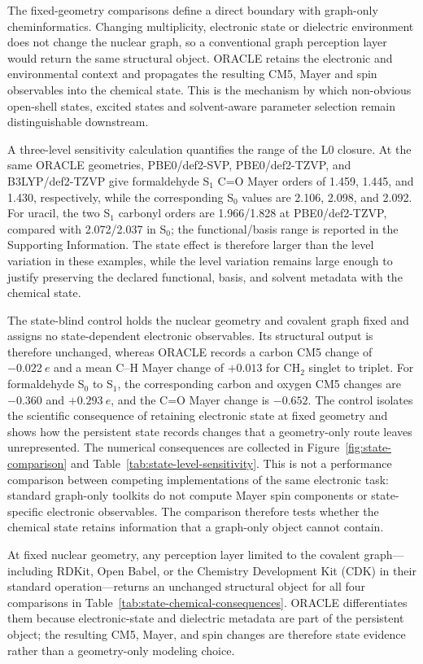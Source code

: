\documentclass[journal=jctcce,manuscript=article]{achemso}
\begin{document}
The fixed-geometry comparisons define a direct boundary with graph-only
cheminformatics. Changing multiplicity, electronic state or dielectric
environment does not change the nuclear graph, so a conventional graph
perception layer would return the same structural object. ORACLE retains the
electronic and environmental context and propagates the resulting CM5, Mayer
and spin observables into the chemical state. This is the mechanism by which
non-obvious open-shell states, excited states and solvent-aware parameter
selection remain distinguishable downstream.

A three-level sensitivity calculation quantifies the range of the L0 closure.
At the same ORACLE geometries, PBE0/def2-SVP, PBE0/def2-TZVP, and
B3LYP/def2-TZVP give formaldehyde S$_1$ C=O Mayer orders of 1.459, 1.445,
and 1.430, respectively, while the corresponding S$_0$ values are 2.106,
2.098, and 2.092. For uracil, the two S$_1$ carbonyl orders are 1.966/1.828
at PBE0/def2-TZVP, compared with 2.072/2.037 in S$_0$; the functional/basis
range is reported in the Supporting Information. The state effect is
therefore larger than the level variation in these examples, while the level
variation remains large enough to justify preserving the declared functional,
basis, and solvent metadata with the chemical state.

The state-blind control holds the nuclear geometry and covalent graph fixed and
assigns no state-dependent electronic observables. Its structural output is
therefore unchanged, whereas ORACLE records a carbon CM5 change of $-0.022~e$
and a mean C--H Mayer change of $+0.013$ for CH$_2$ singlet to triplet. For
formaldehyde S$_0$ to S$_1$, the corresponding carbon and oxygen CM5 changes
are $-0.360$ and $+0.293~e$, and the C=O Mayer change is $-0.652$. The control
isolates the scientific consequence of retaining electronic state at fixed
geometry and shows how the persistent state records changes that a
geometry-only route leaves unrepresented.  The numerical consequences are
collected in Figure~\ref{fig:state-comparison} and
Table~\ref{tab:state-level-sensitivity}.
This is not a performance comparison between competing implementations of the
same electronic task: standard graph-only toolkits do not compute Mayer spin
components or state-specific electronic observables.  The comparison therefore
tests whether the chemical state retains information that a graph-only object
cannot contain.

At fixed nuclear geometry, any perception layer limited to the covalent graph---including
RDKit, Open Babel, or the Chemistry Development Kit (CDK) in their standard operation---returns an unchanged
structural object for all four comparisons in Table~\ref{tab:state-chemical-consequences}.
ORACLE differentiates them because electronic-state and dielectric metadata are
part of the persistent object; the resulting CM5, Mayer, and spin changes are
therefore state evidence rather than a geometry-only modeling choice.
\end{document}
